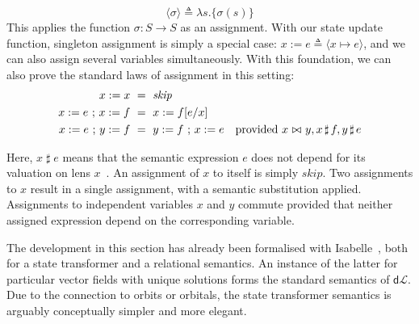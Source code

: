 \documentclass[envcountsame,envcountsect]{llncs}
\newcommand{\sskip}{\mathit{skip}}
\newcommand{\dL}{\mathsf{d}\mathcal{L}}
\newcommand{\Pow}{\mathcal{P}}
\newcommand{\reals}{\mathbb{R}}
\newcommand{\defs}{\triangleq}
\newcommand{\lindep}{\mathop{\,\bowtie\,}}
\newcommand{\unrest}{\mathop{\sharp}}
\newcommand{\seq}{\mathop{\,;\,}}
\begin{document}
\begin{equation}
  \langle \sigma \rangle \defs \lambda s. \{ \sigma(s) \} \tag{st-assgn}
\end{equation}
%
This applies the function $\sigma : S \to S$ as an assignment. With
our state update function, singleton assignment is simply a special
case: $x := e \defs \langle x \mapsto e \rangle$, and we can also
assign several variables simultaneously. With this foundation, we can
also prove the standard laws of assignment in this setting:
%
\begin{align*}
  x := x &~=~ \sskip \\
  x := e \seq x := f &~=~ x := f[e/x] \\
  x := e \seq y := f &~=~ y := f \seq x := e & \textnormal{provided~} x \lindep y, x \unrest f, y \unrest e
\end{align*}

Here, $x \unrest e$ means that the semantic expression $e$ does not
depend for its valuation on lens $x$~\cite{FosterZW16}. An assignment
of $x$ to itself is simply $\sskip$. Two assignments to $x$ result in
a single assignment, with a semantic substitution applied. Assignments
to independent variables $x$ and $y$ commute provided that neither
assigned expression depend on the corresponding variable.


The development in this section has already been formalised with
Isabelle~\cite{afp:hybrid}, both for a state transformer and a
relational semantics. An instance of the latter for particular vector
fields with unique solutions forms the standard semantics of
$\dL$. Due to the connection to orbits or orbitals, the state
transformer semantics is arguably conceptually simpler and more
elegant.


\end{document}
